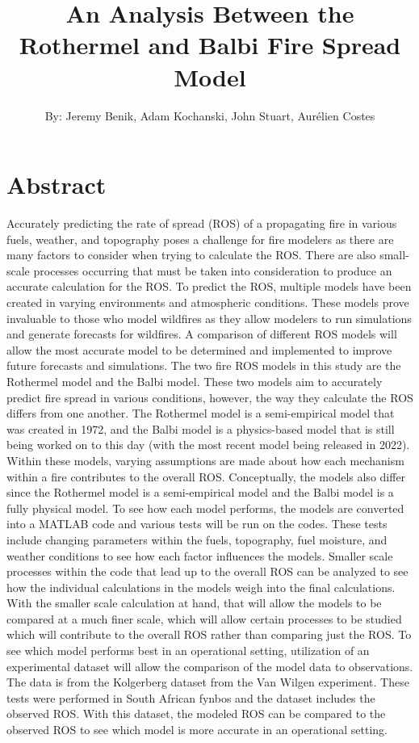 \documentclass{article}
\begin{document}
\title{An Analysis Between the Rothermel and Balbi Fire Spread Model}
\author{By: Jeremy Benik, Adam Kochanski, John Stuart, Aurélien Costes}
\maketitle
\section{Abstract}
Accurately predicting the rate of spread (ROS) of a propagating fire in various fuels, weather, and topography poses a challenge for fire modelers as there are many factors to consider when trying to calculate the ROS. There are also small-scale processes occurring that must be taken into consideration to produce an accurate calculation for the ROS. To predict the ROS, multiple models have been created in varying environments and atmospheric conditions. These models prove invaluable to those who model wildfires as they allow modelers to run simulations and generate forecasts for wildfires. A comparison of different ROS models will allow the most accurate model to be determined and implemented to improve future forecasts and simulations. The two fire ROS models in this study are the Rothermel model and the Balbi model. These two models aim to accurately predict fire spread in various conditions, however, the way they calculate the ROS differs from one another. The Rothermel model is a semi-empirical model that was created in 1972, and the Balbi model is a physics-based model that is still being worked on to this day (with the most recent model being released in 2022). Within these models, varying assumptions are made about how each mechanism within a fire contributes to the overall ROS. Conceptually, the models also differ since the Rothermel model is a semi-empirical model and the Balbi model is a fully physical model. To see how each model performs, the models are converted into a MATLAB code and various tests will be run on the codes. These tests include changing parameters within the fuels, topography, fuel moisture, and weather conditions to see how each factor influences the models. Smaller scale processes within the code that lead up to the overall ROS can be analyzed to see how the individual calculations in the models weigh into the final calculations. With the smaller scale calculation at hand, that will allow the models to be compared at a much finer scale, which will allow certain processes to be studied which will contribute to the overall ROS rather than comparing just the ROS. 
To see which model performs best in an operational setting, utilization of an experimental dataset will allow the comparison of the model data to observations. The data is from the Kolgerberg dataset from the Van Wilgen experiment. These tests were performed in South African fynbos and the dataset includes the observed ROS. With this dataset, the modeled ROS can be compared to the observed ROS to see which model is more accurate in an operational setting.
\end{document}
